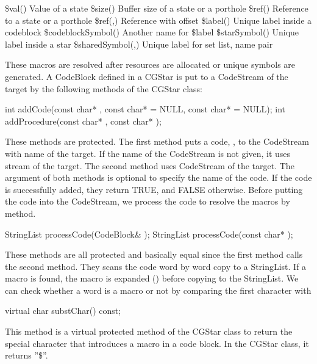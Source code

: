 \$val()			Value of a state
\$size()			Buffer size of a state or a porthole
\$ref()			Reference to a state or a porthole
\$ref(,)		Reference with offset
\$label()			Unique label inside a codeblock
\$codeblockSymbol()		Another name for \$label
\$starSymbol()			Unique label inside a star
\$sharedSymbol(,)	Unique label for set list, name pair

These macros are resolved after resources are allocated or unique symbols are
generated. A CodeBlock defined in a CGStar is put to a CodeStream of
the target by the following methods of the CGStar class:

\begin{example}
int addCode(const char* , const char*  = NULL, const char*  = NULL);
int addProcedure(const char* , const char* );
\end{example}

These methods are protected.
The first method puts a code, , to the CodeStream with 
name 
of the target. If the name of the CodeStream is not given, it uses
 stream of the target. The second method uses 
CodeStream of the target. The argument  of both methods is 
optional to
specify the name of the code. If the code is successfully added, they return
TRUE, and FALSE otherwise. Before putting the code into the CodeStream,
we process the code to resolve the macros by  method.

\begin{example}
StringList processCode(CodeBlock& );
StringList processCode(const char* );
\end{example}

These methods are all protected and basically equal since the first method
calls the second method. They scans the code word by word copy to a
StringList. If a macro is found, the macro is expanded ()
before copying to the StringList. We can check whether a word is a macro
or not by comparing the first character with

\begin{example}
virtual char substChar() const;
\end{example}

This method is a virtual protected method of the CGStar class to return the
special character that introduces a macro in a code block. In the CGStar
class, it returns ''\$''. 

